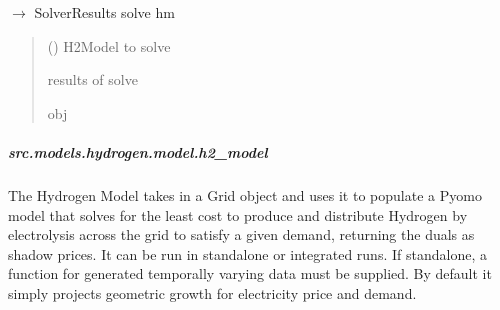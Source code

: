 \documentclass[letterpaper,10pt,english]{sphinxmanual}
\begin{document}

\begin{fulllineitems}
\label{\detokenize{src.models.hydrogen.model.actions:src.models.hydrogen.model.actions.solve_it}}
\pysigstartsignatures
\pysiglinewithargsret
{}
{}
{{ $\rightarrow$ SolverResults}}
\pysigstopsignatures
\sphinxAtStartPar
solve hm
\begin{quote}\begin{description}
\sphinxAtStartPar
{} () \textendash{} H2Model to solve

\sphinxAtStartPar
{} \textendash{} results of solve

\sphinxAtStartPar
obj

\end{description}\end{quote}

\end{fulllineitems}


\sphinxstepscope


\subparagraph{src.models.hydrogen.model.h2\_model}
\label{\detokenize{src.models.hydrogen.model.h2_model:module-src.models.hydrogen.model.h2_model}}\label{\detokenize{src.models.hydrogen.model.h2_model:src-models-hydrogen-model-h2-model}}\label{\detokenize{src.models.hydrogen.model.h2_model::doc}}
\sphinxAtStartPar
The Hydrogen Model takes in a Grid object and uses it to populate a Pyomo model that solves for the
least cost to produce and distribute Hydrogen by electrolysis across the grid to satisfy a given
demand, returning the duals as shadow prices. It can be run in stand\sphinxhyphen{}alone or integrated runs. If
stand\sphinxhyphen{}alone, a function for generated temporally varying data must be supplied. By default it simply
projects geometric growth for electricity price and demand.
\end{document}
